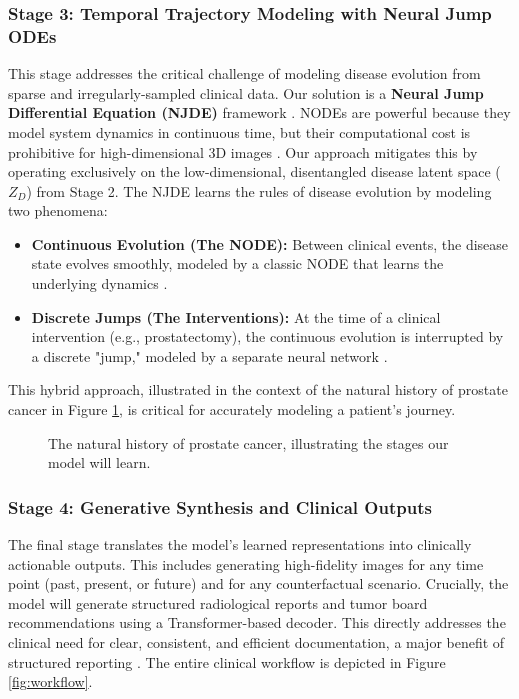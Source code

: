\documentclass[11pt, a4paper]{article}
\begin{document}
\subsubsection{Stage 3: Temporal Trajectory Modeling with Neural Jump ODEs}
This stage addresses the critical challenge of modeling disease evolution from sparse and irregularly-sampled clinical data. Our solution is a \textbf{Neural Jump Differential Equation (NJDE)} framework \cite{GwakSim2020}. NODEs are powerful because they model system dynamics in continuous time, but their computational cost is prohibitive for high-dimensional 3D images \cite{WiewelBecher2018, DavisChoromanski2020}. Our approach mitigates this by operating exclusively on the low-dimensional, disentangled disease latent space ($Z_D$) from Stage 2. The NJDE learns the rules of disease evolution by modeling two phenomena:
\begin{itemize}
    \item \textbf{Continuous Evolution (The NODE):} Between clinical events, the disease state evolves smoothly, modeled by a classic NODE that learns the underlying dynamics \cite{BergHasenclever2018}.
    \item \textbf{Discrete Jumps (The Interventions):} At the time of a clinical intervention (e.g., prostatectomy), the continuous evolution is interrupted by a discrete "jump," modeled by a separate neural network \cite{CuchieroLarsson2019, AbushaqraXue2022}.
\end{itemize}
This hybrid approach, illustrated in the context of the natural history of prostate cancer in Figure \ref{fig:prostate_evolution}, is critical for accurately modeling a patient's journey.

\begin{figure}[H]
    \centering
    \caption{The natural history of prostate cancer, illustrating the stages our model will learn.}
    \label{fig:prostate_evolution}
\end{figure}

\subsubsection{Stage 4: Generative Synthesis and Clinical Outputs}
The final stage translates the model's learned representations into clinically actionable outputs. This includes generating high-fidelity images for any time point (past, present, or future) and for any counterfactual scenario. Crucially, the model will generate structured radiological reports and tumor board recommendations using a Transformer-based decoder. This directly addresses the clinical need for clear, consistent, and efficient documentation, a major benefit of structured reporting \cite{JorgHalfmann2023, SacoranskyKwan2024}. The entire clinical workflow is depicted in Figure \ref{fig:workflow}.
\end{document}
